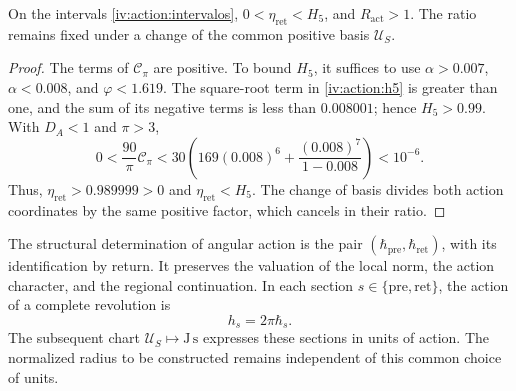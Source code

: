 \begin{proposition}
\label{iv:action:positividad}
On the intervals \eqref{iv:action:intervalos},
\(0<\eta_{\mathrm{ret}}<H_5\), and \(R_{\mathrm{act}}>1\).
The ratio remains fixed under a change of the common positive
basis \(\mathcal U_S\).
\end{proposition}
\begin{proof}
The terms of \(\mathcal C_\pi\) are positive. To bound
\(H_5\), it suffices to use \(\alpha>0.007\), \(\alpha<0.008\),
and \(\varphi<1.619\). The square-root term in \eqref{iv:action:h5}
is greater than one, and the sum of its negative terms is less
than \(0.008001\); hence \(H_5>0.99\).
With \(D_A<1\) and \(\pi>3\),
\[
 0<\frac{90}{\pi}\mathcal C_\pi
 <30\left(169(0.008)^6+
             \frac{(0.008)^7}{1-0.008}\right)<10^{-6}.
\]
Thus, \(\eta_{\mathrm{ret}}>0.989999>0\) and
\(\eta_{\mathrm{ret}}<H_5\). The change of basis divides both
action coordinates by the same positive factor, which cancels
in their ratio.
\end{proof}

The structural determination of angular action is the pair
\((\hbar_{\mathrm{pre}},\hbar_{\mathrm{ret}})\), with its
identification by return. It preserves the valuation of the local
norm, the action character, and the regional continuation.
In each section \(s\in\{\mathrm{pre},\mathrm{ret}\}\), the
action of a complete revolution is
\begin{equation}
 h_s=2\pi\hbar_s.
 \label{iv:action:vuelta}
\end{equation}
The subsequent chart \(\mathcal U_S\mapsto\mathrm{J\,s}\)
expresses these sections in units of action. The normalized radius
to be constructed remains independent of this common choice
of units.

